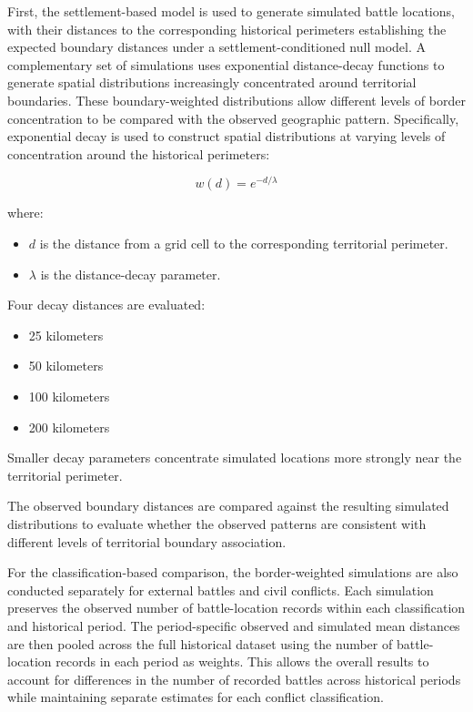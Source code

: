 \documentclass[
  letterpaper,
  DIV=11,
  numbers=noendperiod]{scrartcl}
\providecommand{\tightlist}{%
  \setlength{\itemsep}{0pt}\setlength{\parskip}{0pt}}\usepackage{longtable,booktabs,array}
\begin{document}
First, the settlement-based model is used to generate simulated battle
locations, with their distances to the corresponding historical
perimeters establishing the expected boundary distances under a
settlement-conditioned null model. A complementary set of simulations
uses exponential distance-decay functions to generate spatial
distributions increasingly concentrated around territorial boundaries.
These boundary-weighted distributions allow different levels of border
concentration to be compared with the observed geographic pattern.
Specifically, exponential decay is used to construct spatial
distributions at varying levels of concentration around the historical
perimeters:

\[
w(d) = e^{-d/\lambda}
\]

where:

\begin{itemize}
\tightlist
\item
  \(d\) is the distance from a grid cell to the corresponding
  territorial perimeter.
\item
  \(\lambda\) is the distance-decay parameter.
\end{itemize}

Four decay distances are evaluated:

\begin{itemize}
\tightlist
\item
  25 kilometers
\item
  50 kilometers
\item
  100 kilometers
\item
  200 kilometers
\end{itemize}

Smaller decay parameters concentrate simulated locations more strongly
near the territorial perimeter.

The observed boundary distances are compared against the resulting
simulated distributions to evaluate whether the observed patterns are
consistent with different levels of territorial boundary association.

For the classification-based comparison, the border-weighted simulations
are also conducted separately for external battles and civil conflicts.
Each simulation preserves the observed number of battle-location records
within each classification and historical period. The period-specific
observed and simulated mean distances are then pooled across the full
historical dataset using the number of battle-location records in each
period as weights. This allows the overall results to account for
differences in the number of recorded battles across historical periods
while maintaining separate estimates for each conflict classification.
\end{document}
